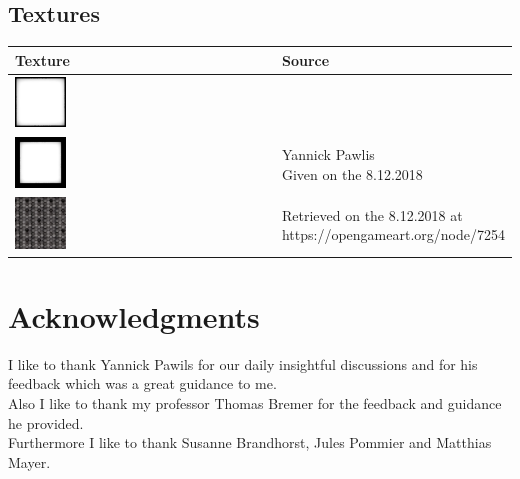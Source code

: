\documentclass[a4paper, twoside, 10pt]{report}
\begin{document}
\section{Textures}
\begin{centering}
\begin{tabular}{l|l}
Texture & Source \\
\hline
\includegraphics[width=0.2\textwidth]{Images/BlackBorder.png} &  \\
\includegraphics[width=0.2\textwidth]{Images/BlackThickBorder.png} & 
\makecell[l]{Yannick Pawlis \\ Given on the 8.12.2018} \\
\hline
\includegraphics[width=0.2\textwidth]{Images/airbase_radar_panels.jpg} & 
\makecell[l]{Retrieved on the 8.12.2018 at \\ \linebreak https://opengameart.org/node/7254}
\end{tabular}
\end{centering}




\listoffigures



\chapter*{Acknowledgments}
I like to thank Yannick Pawils for our daily insightful discussions and for his feedback which was a great guidance to me. \\
Also I like to thank my professor Thomas Bremer for the feedback and guidance he provided.\\
Furthermore I like to thank Susanne Brandhorst, Jules Pommier and Matthias Mayer.
\end{document}
